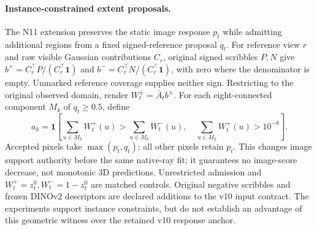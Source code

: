 \paragraph{Instance-constrained extent proposals.}
The N11 extension preserves the static image response $p_t$ while admitting
additional regions from a fixed signed-reference proposal $q_t$. For reference
view $r$ and raw visible Gaussian contributions $C_r$, original signed scribbles
$P,N$ give $b^+=C_r^\top P/(C_r^\top\mathbf1)$ and
$b^-=C_r^\top N/(C_r^\top\mathbf1)$, with zero where the denominator is empty.
Unmarked reference coverage supplies neither sign. Restricting to the original
observed domain, render $W_t^\pm=\bar A_t b^\pm$. For each eight-connected
component $M_k$ of $q_t\geq0.5$, define
\[
 a_k=\mathbf1\!\left[\sum_{u\in M_k}W_t^+(u)>
 \sum_{u\in M_k}W_t^-(u),\quad \sum_{u\in M_k}W_t^+(u)>10^{-8}\right].
\]
Accepted pixels take $\max(p_t,q_t)$; all other pixels retain $p_t$. This
changes image support authority before the same native-ray fit; it guarantees
no image-score decrease, not monotonic 3D predictions. Unrestricted admission
and $W_t^+=z_t^0,W_t^-=1-z_t^0$ are matched controls. Original negative scribbles
and frozen DINOv2 descriptors are declared additions to the v10 input contract.
The experiments support instance constraints, but do not establish an advantage
of this geometric witness over the retained v10 response anchor.

